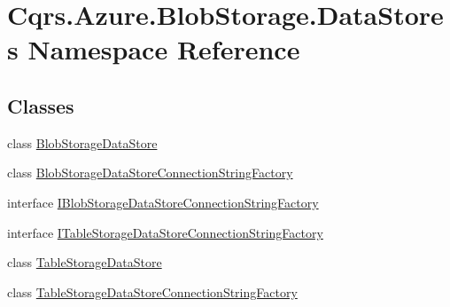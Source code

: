\hypertarget{namespaceCqrs_1_1Azure_1_1BlobStorage_1_1DataStores}{}\section{Cqrs.\+Azure.\+Blob\+Storage.\+Data\+Stores Namespace Reference}
\label{namespaceCqrs_1_1Azure_1_1BlobStorage_1_1DataStores}
\subsection*{Classes}
\begin{DoxyCompactItemize}
\item 
class \hyperlink{classCqrs_1_1Azure_1_1BlobStorage_1_1DataStores_1_1BlobStorageDataStore}{Blob\+Storage\+Data\+Store}
\item 
class \hyperlink{classCqrs_1_1Azure_1_1BlobStorage_1_1DataStores_1_1BlobStorageDataStoreConnectionStringFactory}{Blob\+Storage\+Data\+Store\+Connection\+String\+Factory}
\item 
interface \hyperlink{interfaceCqrs_1_1Azure_1_1BlobStorage_1_1DataStores_1_1IBlobStorageDataStoreConnectionStringFactory}{I\+Blob\+Storage\+Data\+Store\+Connection\+String\+Factory}
\item 
interface \hyperlink{interfaceCqrs_1_1Azure_1_1BlobStorage_1_1DataStores_1_1ITableStorageDataStoreConnectionStringFactory}{I\+Table\+Storage\+Data\+Store\+Connection\+String\+Factory}
\item 
class \hyperlink{classCqrs_1_1Azure_1_1BlobStorage_1_1DataStores_1_1TableStorageDataStore}{Table\+Storage\+Data\+Store}
\item 
class \hyperlink{classCqrs_1_1Azure_1_1BlobStorage_1_1DataStores_1_1TableStorageDataStoreConnectionStringFactory}{Table\+Storage\+Data\+Store\+Connection\+String\+Factory}
\end{DoxyCompactItemize}
